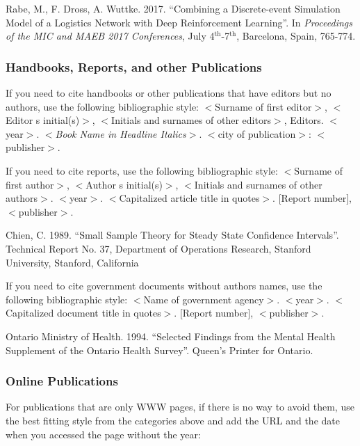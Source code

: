 \documentclass{article}
\begin{document}
{\footnotesize
\begin{hangref}
\item Rabe, M., F. Dross, A. Wuttke. 2017. ``Combining a Discrete-event Simulation Model of a Logistics Network with Deep Reinforcement Learning''. In \textit{Proceedings of the MIC and MAEB 2017 Conferences}, July 4$^{\textrm{th}}$-7$^{\textrm{th}}$, Barcelona, Spain, 765-774.
\end{hangref}
}

\subsubsection{Handbooks, Reports, and other Publications}
If you need to cite handbooks or other publications that have editors but no authors, use the following bibliographic style: 
$<$Surname of first editor$>$, $<$Editor s initial(s)$>$, $<$Initials and surnames of other editors$>$, Editors. 
$<$year$>$. $<${\em Book Name in Headline Italics}$>$. $<$city of publication$>$: $<$publisher$>$.

If you need to cite reports, use the following bibliographic style: $<$Surname of first author$>$, $<$Author s initial(s)$>$, $<$Initials and surnames of other authors$>$. $<$year$>$. $<$Capitalized article title in quotes$>$. $[$Report number$]$, $<$publisher$>$.

{\footnotesize
\begin{hangref}
\item Chien, C. 1989. ``Small Sample Theory for Steady State Confidence Intervals''. Technical Report No. 37, Department of Operations Research, Stanford University, Stanford, California
\end{hangref}
}

If you need to cite government documents without authors  names, use the following bibliographic style: $<$Name of government agency$>$. $<$year$>$. $<$Capitalized document title in quotes$>$. $[$Report number$]$, $<$publisher$>$.

{\footnotesize
\begin{hangref}
\item Ontario Ministry of Health. 1994. ``Selected Findings from the Mental Health Supplement of the Ontario Health Survey''. Queen's Printer for Ontario.
\end{hangref}
}

\subsubsection{Online Publications}
For publications that are only WWW pages, if there is no way to avoid them, use the best fitting style from the categories above and add the URL and the date when you accessed the page without the year:
\end{document}

